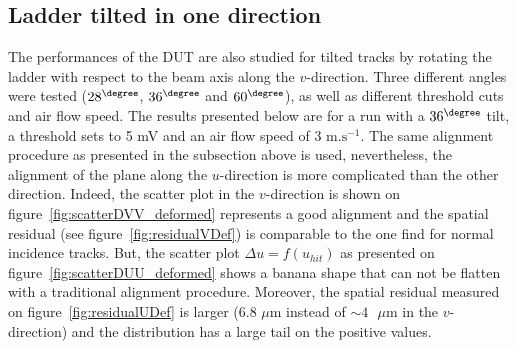     \subsection{Ladder tilted in one direction}
    \label{subsec:deformation}

      The performances of the \gls{DUT} are also studied for tilted tracks by rotating the ladder with respect to the beam axis along the $v$-direction.
      Three different angles were tested ($28^{\degree}$, $36^{\degree}$ and $60^{\degree}$), as well as different threshold cuts and air flow speed. 
      The results presented below are for a run with a $36^{\degree}$ tilt, a threshold sets to 5 mV and an air flow speed of 3 $\text{m.s}^{-1}$.
      The same alignment procedure as presented in the subsection above is used, nevertheless, the alignment of the plane along the $u$-direction is more complicated than the other direction.
      Indeed, the scatter plot in the $v$-direction is shown on figure~\ref{fig:scatterDVV_deformed} represents a good alignment and the spatial residual (see figure~\ref{fig:residualVDef}) is comparable to the one find for normal incidence tracks.
      But, the scatter plot $\Delta u=f(u_{hit})$ as presented on figure~\ref{fig:scatterDUU_deformed} shows a banana shape that can not be flatten with a traditional alignment procedure.
      Moreover, the spatial residual measured on figure~\ref{fig:residualUDef} is larger (6.8 $\mu\text{m}$ instead of $\sim 4 \text{ }\mu\text{m}$ in the $v$-direction) and the distribution has a large tail on the positive values.

